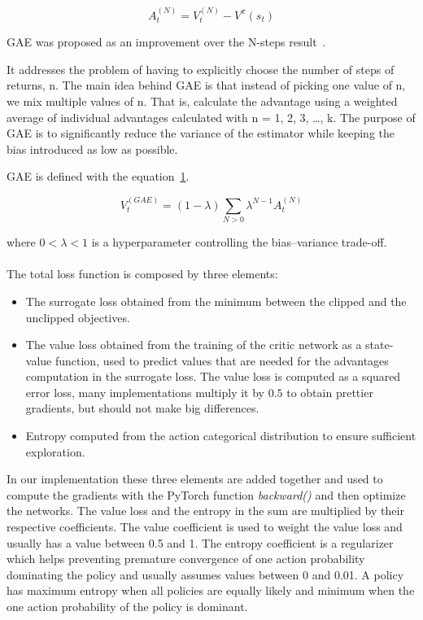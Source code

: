 \documentclass[11pt, a4paper, hidelinks]{report}
\begin{document}
\begin{equation}
	A_t^{(N)} = V_t^{(N)} - V^{\pi}(s_t)\label{eq:N-step-advantage}
\end{equation}

GAE was proposed as an improvement over the N-steps result~\citep{gae}.

\begin{quoting}[font=itshape, begintext={"}, endtext={"\citep{graesser2019foundations}}]
It addresses the problem of having to explicitly choose the number of steps of returns, n.
The main idea behind GAE is that instead of picking one value of n, we mix multiple values of n.
That is, calculate the advantage using a weighted average of individual advantages calculated with n = 1, 2, 3, \dots, k.
The purpose of GAE is to significantly reduce the variance of the estimator while keeping the bias introduced as low as possible.
\end{quoting}

GAE is defined with the equation~\ref{fig:GAE}.

\begin{figure}
	\[ V_t^{(GAE)} = (1 - \lambda)\sum_{N > 0} \lambda^{N - 1}A_t^{(N)} \]
	\caption{}
	\label{fig:GAE}
\end{figure}

where $0 < \lambda < 1$ is a hyperparameter controlling the bias–variance trade-off.
\\
\\
The total loss function is composed by three elements:
\begin{itemize}
	\item The surrogate loss obtained from the minimum between the clipped and the unclipped objectives.
	\item The value loss obtained from the training of the critic network as a state-value function, used to predict values that are needed for the advantages computation in the surrogate loss.
The value loss is computed as a squared error loss, many implementations multiply it by $0.5$ to obtain prettier gradients, but should not make big differences.
	\item Entropy computed from the action categorical distribution to ensure sufficient exploration.
\end{itemize}

In our implementation these three elements are added together and used to compute the gradients with the PyTorch function \textit{backward()} and then optimize the networks.
The value loss and the entropy in the sum are multiplied by their respective coefficients.
The value coefficient is used to weight the value loss and usually has a value between 0.5 and 1.
The entropy coefficient is a regularizer which helps preventing premature convergence of one action probability dominating the policy and usually assumes values between 0 and 0.01.
A policy has maximum entropy when all policies are equally likely and minimum when the one action probability of the policy is dominant.
\end{document}
